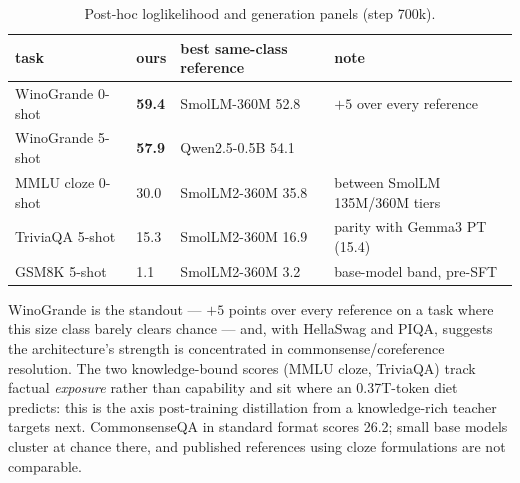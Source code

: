 \begin{table}[h]
\centering
\small
\caption{Post-hoc loglikelihood and generation panels (step 700k).}
\label{tab:panels}
\begin{tabular}{llll}
\toprule
task & ours & best same-class reference & note \\
\midrule
WinoGrande 0-shot & \textbf{59.4} & SmolLM-360M 52.8 & $+5$ over every reference \\
WinoGrande 5-shot & \textbf{57.9} & Qwen2.5-0.5B 54.1 & \\
MMLU cloze 0-shot & 30.0 & SmolLM2-360M 35.8 & between SmolLM 135M/360M tiers \\
TriviaQA 5-shot & 15.3 & SmolLM2-360M 16.9 & parity with Gemma3 PT (15.4) \\
GSM8K 5-shot & 1.1 & SmolLM2-360M 3.2 & base-model band, pre-SFT \\
\bottomrule
\end{tabular}
\end{table}

WinoGrande is the standout --- $+5$ points over every reference on a
task where this size class barely clears chance --- and, with HellaSwag
and PIQA, suggests the architecture's strength is concentrated in
commonsense/coreference resolution. The two knowledge-bound scores
(MMLU cloze, TriviaQA) track factual \emph{exposure} rather than
capability and sit where an 0.37T-token diet predicts: this is the axis
post-training distillation from a knowledge-rich teacher targets next.
CommonsenseQA in standard format scores 26.2; small base models cluster
at chance there, and published references using cloze formulations are
not comparable.
